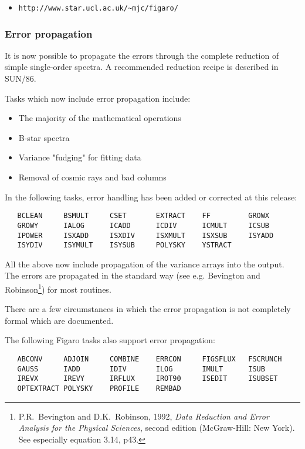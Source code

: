 \begin{itemize}
   \item {\tt http://www.star.ucl.ac.uk/\~{}mjc/figaro/}
\end{itemize}

\subsubsection{Error propagation}

 It is now possible to propagate the errors through the complete
 reduction of simple single-order spectra.  A recommended reduction
 recipe is described in SUN/86.

 Tasks which now include error propagation include:

\begin{itemize}
\item The majority of the mathematical operations
\item B-star spectra
\item Variance "fudging" for fitting data
\item Removal of cosmic rays and bad columns
\end{itemize}

 In the following tasks, error handling has been added or corrected
 at this release:

\begin{verbatim}
   BCLEAN     BSMULT     CSET       EXTRACT    FF         GROWX
   GROWY      IALOG      ICADD      ICDIV      ICMULT     ICSUB
   IPOWER     ISXADD     ISXDIV     ISXMULT    ISXSUB     ISYADD
   ISYDIV     ISYMULT    ISYSUB     POLYSKY    YSTRACT
\end{verbatim}

 All the above now include propagation of the variance arrays into
 the output.  The errors are propagated in the standard way (see e.g.
 Bevington and Robinson\footnote{P.R.~Bevington and D.K.~Robinson,
 1992, {\it Data Reduction and Error Analysis for the Physical Sciences},
 second edition (McGraw-Hill: New York).  See especially equation 3.14,
 p43.}) for most routines.

 There are a few circumstances in which the error propagation is not
 completely formal which are documented.

 The following Figaro tasks also support error propagation:

\begin{verbatim}
   ABCONV     ADJOIN     COMBINE    ERRCON     FIGSFLUX   FSCRUNCH
   GAUSS      IADD       IDIV       ILOG       IMULT      ISUB
   IREVX      IREVY      IRFLUX     IROT90     ISEDIT     ISUBSET
   OPTEXTRACT POLYSKY    PROFILE    REMBAD
\end{verbatim}

